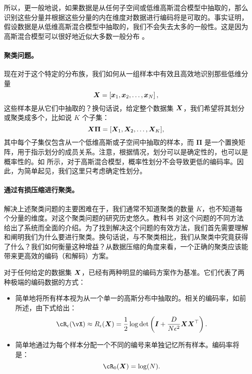 \documentclass[../../book-main_zh.tex]{subfiles}
\begin{document}
所以，更一般地说，如果数据是从任何子空间或低维高斯混合模型中抽取的，那么识别这些分量并根据这些分量的内在维度对数据进行编码将是可取的。事实证明，假设数据是从低维高斯混合模型中抽取的，我们不会失去太多的一般性。这是因为高斯混合模型可以很好地近似大多数一般分布 \cite{borkar2016gaussian}。

\paragraph{聚类问题。}
现在对于这个特定的分布族，我们如何从一组样本中有效且高效地识别那些低维分量
\begin{equation}
	\bm{X} = \left[\bm{x}_1, \bm{x}_2, \ldots, \bm{x}_N\right],
\end{equation}
这些样本是从它们中抽取的？换句话说，给定整个数据集 $\bm{X}$，我们希望将其划分或聚类成多个，比如说 $K$ 个子集：
\begin{equation}
	\bm{X}\bm \Pi = [\bm{X}_1, \bm{X}_2, \dots, \bm{X}_K],
\end{equation}
其中每个子集仅包含从一个低维高斯或子空间中抽取的样本，而 $\bm \Pi$ 是一个置换矩阵，用于指示划分的成员关系。注意，根据情况，划分可以是确定性的，也可以是概率性的。如 \cite{ma2007segmentation} 所示，对于高斯混合模型，概率性划分不会导致更低的编码率。因此，为简单起见，我们这里只考虑确定性划分。

\paragraph{通过有损压缩进行聚类。}
解决上述聚类问题的主要困难在于，我们通常不知道聚类的数量 $K$，也不知道每个分量的维度。对这个聚类问题的研究历史悠久。教科书 \cite{GPCA} 对这个问题的不同方法给出了系统而全面的介绍。为了找到解决这个问题的有效方法，我们首先需要理解和阐明我们为什么要进行聚类。换句话说，与不聚类相比，我们从聚类中究竟获得了什么？我们如何衡量这种增益？从数据压缩的角度来看，一个正确的聚类应该能带来更高效的编码（和解码）方案。

对于任何给定的数据集 $\bm{X}$，已经有两种明显的编码方案作为基准。它们代表了两种极端的编码数据的方式：
\begin{itemize}
	\item 简单地将所有样本视为从一个单一的高斯分布中抽取的。相关的编码率，如前所述，由下式给出：
	      \begin{equation}
		      \cR_{\epsilon}(\vX) \approx R_{\epsilon}(\X) = \frac{1}{2} \log \det \left(\boldsymbol{I} + \frac{D}{N\epsilon^2} \X\X^\top \right).
	      \end{equation}
	\item 简单地通过为每个样本分配一个不同的编号来单独记忆所有样本。编码率将是：
	      \begin{equation}
		      \cR_0(\X) = \log(N).
	      \end{equation}
\end{itemize}
\end{document}
